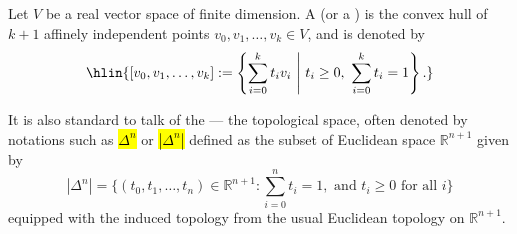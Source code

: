 \begin{definition} \label{definition:geometric_simplex_of_independent_points_in_a_real_vector_space}
Let $V$ be a real vector space of finite dimension.  
A  (or a ) is the convex hull of $k+1$ affinely independent points $v_0, v_1, \dots, v_k \in V$, and is denoted by
$$\hlin{[v_0, v_1, \dots, v_k] := \left\{ \sum_{i=0}^k t_i v_i \ \middle| \ t_i \ge 0, \ \sum_{i=0}^k t_i = 1 \right\}.}$$


It is also standard to talk of the  ---  the topological space, often denoted by notations such as \hl{$\Delta^n$} or \hl{$|\Delta^n|$} defined as the subset of Euclidean space $\mathbb{R}^{n+1}$ given by
$$ |\Delta^n| = \Big\{ (t_0, t_1, \ldots, t_n) \in \mathbb{R}^{n+1} : \sum_{i=0}^n t_i = 1, \text{ and } t_i \geq 0 \text{ for all } i \Big\} $$
equipped with the induced topology from the usual Euclidean topology on $\mathbb{R}^{n+1}$.


\end{definition}
